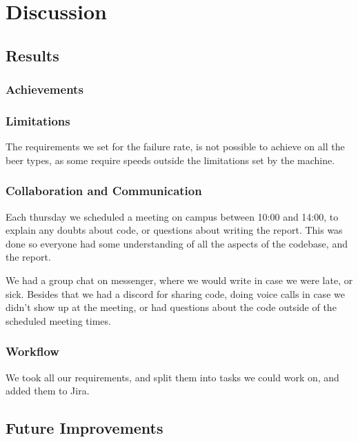 \section{Discussion}

\subsection{Results}
\subsubsection{Achievements}

\subsubsection{Limitations}
The requirements we set for the failure rate,
is not possible to achieve on all the beer types,
as some require speeds outside the limitations set by the machine.

\subsubsection{Collaboration and Communication}
Each thursday we scheduled a meeting on campus between 10:00 and 14:00,
to explain any doubts about code, or questions about writing the report.
This was done so everyone had some understanding of all the aspects 
of the codebase, and the report.


We had a group chat on messenger, where we would write in case we were late,
or sick.
Besides that we had a discord for sharing code, doing voice calls in case 
we didn't show up at the meeting, or had questions about the code 
outside of the scheduled meeting times.

\subsubsection{Workflow}
We took all our requirements, and split them into tasks we could work on, 
and added them to Jira.

\subsection{Future Improvements}
